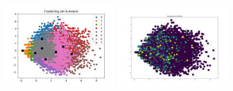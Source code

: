 \documentclass[a4paper, 10pt]{report}
\begin{document}
            \begin{center}
                \includegraphics[width=6cm]{modelling/ClusterK-Means}
                \includegraphics[width=6cm]{modelling/DBScan}
            \end{center}
\end{document}
